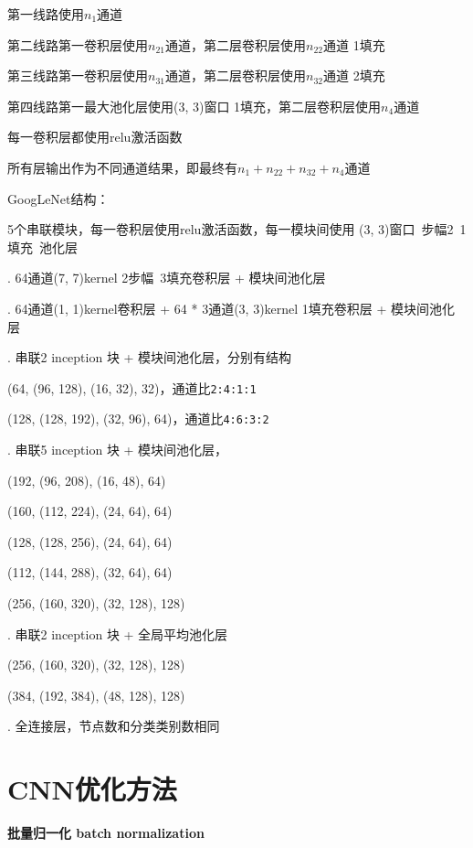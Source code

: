 \documentclass[UTF8]{ctexart}
\begin{document}
  \quad \quad 第一线路使用$n_1$通道
 
  \quad \quad 第二线路第一卷积层使用$n_{21}$通道，第二层卷积层使用$n_{22}$通道 1填充
 
  \quad \quad 第三线路第一卷积层使用$n_{31}$通道，第二层卷积层使用$n_{32}$通道 2填充
  
  \quad \quad 第四线路第一最大池化层使用(3, 3)窗口 1填充，第二层卷积层使用$n_4$通道

  \quad 每一卷积层都使用relu激活函数

  \quad 所有层输出作为不同通道结果，即最终有$n_1 + n_{22} + n_{32} + n_4$通道

  GoogLeNet结构：

  \quad 5个串联模块，每一卷积层使用relu激活函数，每一模块间使用 (3, 3)窗口\ 步幅2\ 1填充\ 池化层

  . 64通道(7, 7)kernel 2步幅\ 3填充卷积层 + 模块间池化层

  . 64通道(1, 1)kernel卷积层 + 64 * 3通道(3, 3)kernel 1填充卷积层 + 模块间池化层

  . 串联2 inception 块 + 模块间池化层，分别有结构

  \quad \quad (64, (96, 128), (16, 32), 32)，通道比\texttt{2:4:1:1}

  \quad \quad (128, (128, 192), (32, 96), 64)，通道比\texttt{4:6:3:2}

  . 串联5 inception 块 + 模块间池化层，

  \quad \quad (192, (96, 208), (16, 48), 64)

  \quad \quad (160, (112, 224), (24, 64), 64)

  \quad \quad (128, (128, 256), (24, 64), 64)

  \quad \quad (112, (144, 288), (32, 64), 64)

  \quad \quad (256, (160, 320), (32, 128), 128)

  . 串联2 inception 块 + 全局平均池化层

  \quad \quad (256, (160, 320), (32, 128), 128)

  \quad \quad (384, (192, 384), (48, 128), 128)

  . 全连接层，节点数和分类类别数相同

\section{CNN优化方法}
\noindent \textbf{批量归一化 batch normalization}
\end{document}
